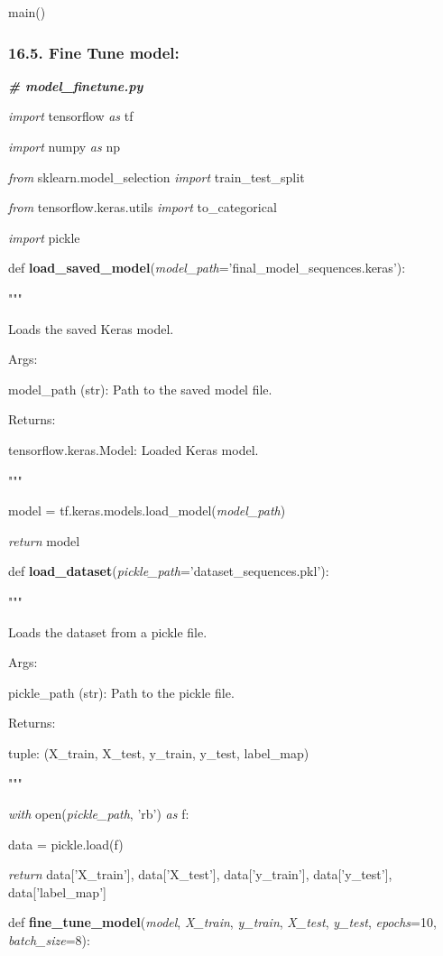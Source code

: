 \documentclass[
]{article}
\begin{document}
main()

\hypertarget{fine-tune-model}{%
\subsubsection{16.5. Fine Tune model:}\label{fine-tune-model}}

\emph{\textbf{\# model\_finetune.py}}

\emph{import} tensorflow \emph{as} tf

\emph{import} numpy \emph{as} np

\emph{from} sklearn.model\_selection \emph{import} train\_test\_split

\emph{from} tensorflow.keras.utils \emph{import} to\_categorical

\emph{import} pickle

def \textbf{load\_saved\_model}(\emph{model\_path}='final\_model\_sequences.keras'):

"""

Loads the saved Keras model.

Args:

model\_path (str): Path to the saved model file.

Returns:

tensorflow.keras.Model: Loaded Keras model.

"""

model = tf.keras.models.load\_model(\emph{model\_path})

\emph{return} model

def \textbf{load\_dataset}(\emph{pickle\_path}='dataset\_sequences.pkl'):

"""

Loads the dataset from a pickle file.

Args:

pickle\_path (str): Path to the pickle file.

Returns:

tuple: (X\_train, X\_test, y\_train, y\_test, label\_map)

"""

\emph{with} open(\emph{pickle\_path}, 'rb') \emph{as} f:

data = pickle.load(f)

\emph{return} data{[}'X\_train'{]}, data{[}'X\_test'{]}, data{[}'y\_train'{]}, data{[}'y\_test'{]}, data{[}'label\_map'{]}

def \textbf{fine\_tune\_model}(\emph{model}, \emph{X\_train}, \emph{y\_train}, \emph{X\_test}, \emph{y\_test}, \emph{epochs}=10, \emph{batch\_size}=8):
\end{document}

